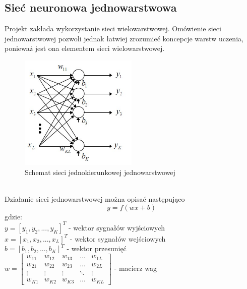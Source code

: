 \documentclass[a4paper, openright, twoside,11pt]{article}
\begin{document}
    \clearpage
    \subsection{Sieć neuronowa jednowarstwowa}
    Projekt zakłada wykorzystanie sieci wielowarstwowej. Omówienie sieci jednowarstwowej pozwoli jednak łatwiej zrozumieć koncepcje warstw uczenia, ponieważ jest ona elementem sieci wielowarstwowej.
    \begin{figure}[h]
        \centering
        \includegraphics[width=0.5\textwidth]{Grafika/schemat_1w.jpg}
        \caption{Schemat sieci jednokierunkowej jednowarstwowej}
        \label{fig:SchematSieci1}
    \end{figure}\\
    Działanie sieci jednowarstwowej można opisać następująco
    \begin{equation} \label{dzialanie_jednowarstwowej}
    y = f\left(w x + b \right)
    \end{equation}
    gdzie:\\[0.3cm]
    $y = [y_1, y_2, ..., y_K]^T$  - wektor sygnałów wyjściowych \\[0.3cm]
    $x = [x_1,x_2,...,x_L]^T$ - wektor sygnałów wejściowych \\[0.3cm]
    $b = [b_1,b_2, ..., b_K]^T$ - wektor przesunięć \\[0.3cm]
    $w=\begin{bmatrix}
    w_{11} & w_{12} & w_{13} & \dots  & w_{1L} \\
    w_{21} & w_{22} & w_{23} & \dots  & w_{2L} \\
    \vdots & \vdots & \vdots & \ddots & \vdots \\
    w_{K1} & w_{K2} & w_{K3} & \dots  & w_{KL}
    \end{bmatrix}$ - macierz wag
    
\end{document}

